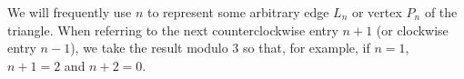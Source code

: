 We will frequently use $n$ to represent some arbitrary edge $L_n$ or vertex $P_n$ of the triangle.
When referring to the next counterclockwise entry $n+1$ (or clockwise entry $n-1$),
we take the result modulo $3$ so that, for example, if $n = 1$, $n+1 = 2$ and $n+2 = 0$.

\newcommand{\trimetrictable}[8]{%
  \begin{center}
  \begin{tabular}{ll}
    \multicolumn{2}{r}{\textbf{\sffamily\Large triangle #1}}\\\hline
    Dimension:                           & #2\\ 
    Acceptable Range:                    & #3\\ 
    Normal Range:                        & #4\\ 
    Full Range:                          & #5\\ 
    $q$ for equilateral unit triangle:   & #6\\
    Reference:                           & #7\\
    \verd\ function:       & \texttt{#8}\\ \hline
  \end{tabular} 
  \end{center}
}

\newpage 
\newpage 
\newpage 
\newpage 
\newpage 
\newpage 
\newpage 
\newpage 
\newpage 
\newpage 
\newpage 
\newpage 
\newpage 
